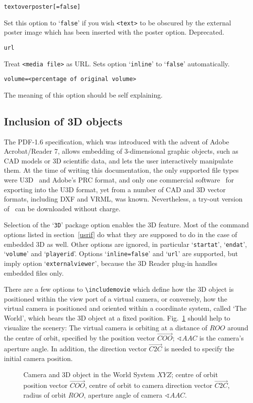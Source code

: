 \documentclass[a4paper]{article}
\begin{document}
\begin{verbatim}
textoverposter[=false]
\end{verbatim}
Set this option to `\verb+false+' if you wish \verb+<text>+ to be obscured by the external poster image which has been inserted with the poster option. Deprecated.
\begin{verbatim}
url
\end{verbatim}
Treat \verb+<media file>+ as URL. Sets option `\verb+inline+' to `\verb+false+' automatically.
\begin{verbatim}
volume=<percentage of original volume>
\end{verbatim}
The meaning of this option should be self explaining.

\subsection{Inclusion of 3D objects}\label{sec:3D}
The PDF-1.6 specification, which was introduced with the advent of Adobe Acrobat/Reader 7, allows embedding of 3-dimensional graphic objects, such as CAD models or 3D scientific data, and lets the user interactively manipulate them. At the time of writing this documentation, the only supported file types were U3D~\cite{3diforg} and Adobe's PRC format, and only one commercial software~\cite{dexp} for exporting into the U3D format, yet from a number of CAD and 3D vector formats, including DXF and VRML, was known. Nevertheless, a try-out version of~\cite{dexp} can be downloaded without charge.

Selection of the `\verb+3D+' package option enables the 3D feature. Most of the command options listed in section~\ref{usrif} do what they are supposed to do in the case of embedded 3D as well. Other options are ignored, in particular `\verb+startat+', `\verb+endat+', `\verb+volume+' and `\verb+playerid+'. Options `\verb+inline=false+' and `\verb+url+' are supported, but imply option `{\tt{}ex\-ter\-nal\-view\-er}', because the 3D Reader plug-in handles embedded files only.

There are a few options to \verb+\includemovie+ which define how the 3D object is positioned within the view port of a virtual camera, or conversely, how the virtual camera is positioned and oriented within a coordinate system, called `The World', which bears the 3D object at a fixed position. Fig.~\ref{3dscene} should help to visualize the scenery: The virtual camera is orbiting at a distance of $ROO$ around the centre of orbit, specified by the position vector $\overrightarrow{COO}$; $\sphericalangle AAC$ is the camera's aperture angle. In addition, the direction vector $\overrightarrow{C2C}$ is needed to specify the initial camera position.
\begin{figure}[ht]
  \resizebox{\linewidth}{!}{}
  \caption{Camera and 3D object in the World System $XYZ$; centre of orbit position vector $\vec{COO}$, centre of orbit to camera direction vector $\vec{C2C}$, radius of orbit $ROO$, aperture angle of camera $\sphericalangle AAC$.}\label{3dscene}
\end{figure}
\end{document}
